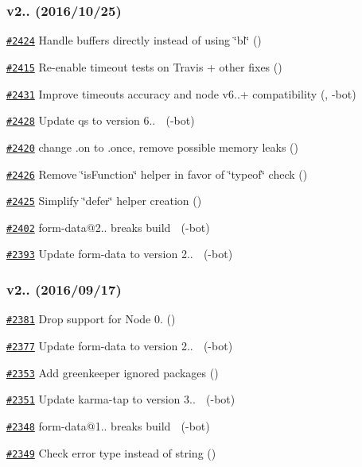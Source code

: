 \subsubsection*{v2.. (2016/10/25)}


\begin{DoxyItemize}
\item \href{https://github.com/request/request/pull/2424}{\tt \#2424} Handle buffers directly instead of using \char`\"{}bl\char`\"{} ()
\item \href{https://github.com/request/request/pull/2415}{\tt \#2415} Re-\/enable timeout tests on Travis + other fixes ()
\item \href{https://github.com/request/request/pull/2431}{\tt \#2431} Improve timeouts accuracy and node v6..+ compatibility (, -\/bot)
\item \href{https://github.com/request/request/pull/2428}{\tt \#2428} Update qs to version 6.. 🚀 (-\/bot)
\item \href{https://github.com/request/request/pull/2420}{\tt \#2420} change .on to .once, remove possible memory leaks ()
\item \href{https://github.com/request/request/pull/2426}{\tt \#2426} Remove \char`\"{}is\+Function\char`\"{} helper in favor of \char`\"{}typeof\char`\"{} check ()
\item \href{https://github.com/request/request/pull/2425}{\tt \#2425} Simplify \char`\"{}defer\char`\"{} helper creation ()
\item \href{https://github.com/request/request/pull/2402}{\tt \#2402} form-\/data@2.. breaks build 🚨 (-\/bot)
\item \href{https://github.com/request/request/pull/2393}{\tt \#2393} Update form-\/data to version 2.. 🚀 (-\/bot)
\end{DoxyItemize}

\subsubsection*{v2.. (2016/09/17)}


\begin{DoxyItemize}
\item \href{https://github.com/request/request/pull/2381}{\tt \#2381} Drop support for Node 0. ()
\item \href{https://github.com/request/request/pull/2377}{\tt \#2377} Update form-\/data to version 2.. 🚀 (-\/bot)
\item \href{https://github.com/request/request/pull/2353}{\tt \#2353} Add greenkeeper ignored packages ()
\item \href{https://github.com/request/request/pull/2351}{\tt \#2351} Update karma-\/tap to version 3.. 🚀 (-\/bot)
\item \href{https://github.com/request/request/pull/2348}{\tt \#2348} form-\/data@1.. breaks build 🚨 (-\/bot)
\item \href{https://github.com/request/request/pull/2349}{\tt \#2349} Check error type instead of string ()
\end{DoxyItemize}

